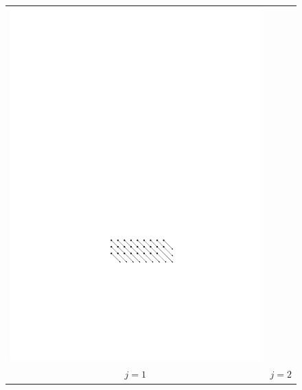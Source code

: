 \documentclass{ws-ijcga}
\begin{document}
\begin{figure}
\begin{tabular}{cc}
     \includegraphics[scale=0.9]{j2} \\
      $j=1$ & $j=2$ \\

\end{tabular}
\end{figure}
\end{document}
